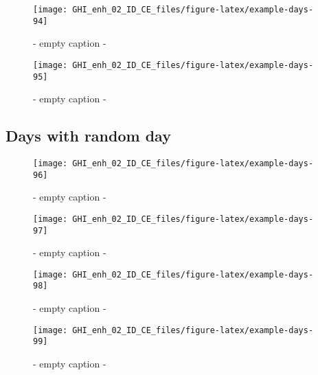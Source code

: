 \documentclass[
  10pt,
  a4paper,oneside]{article}
\begin{document}
\begin{figure}[H]

{\centering \texttt{[image: GHI\_enh\_02\_ID\_CE\_files/figure-latex/example-days-94]} 

}

\caption{ - empty caption - }\label{fig:example-days-94}
\end{figure}

\begin{figure}[H]

{\centering \texttt{[image: GHI\_enh\_02\_ID\_CE\_files/figure-latex/example-days-95]} 

}

\caption{ - empty caption - }\label{fig:example-days-95}
\end{figure}

\FloatBarrier

\hypertarget{days-with-random-day}{%
\subsection{Days with random day}\label{days-with-random-day}}

\begin{figure}[H]

{\centering \texttt{[image: GHI\_enh\_02\_ID\_CE\_files/figure-latex/example-days-96]} 

}

\caption{ - empty caption - }\label{fig:example-days-96}
\end{figure}

\begin{figure}[H]

{\centering \texttt{[image: GHI\_enh\_02\_ID\_CE\_files/figure-latex/example-days-97]} 

}

\caption{ - empty caption - }\label{fig:example-days-97}
\end{figure}

\begin{figure}[H]

{\centering \texttt{[image: GHI\_enh\_02\_ID\_CE\_files/figure-latex/example-days-98]} 

}

\caption{ - empty caption - }\label{fig:example-days-98}
\end{figure}

\begin{figure}[H]

{\centering \texttt{[image: GHI\_enh\_02\_ID\_CE\_files/figure-latex/example-days-99]} 

}

\caption{ - empty caption - }\label{fig:example-days-99}
\end{figure}
\end{document}
